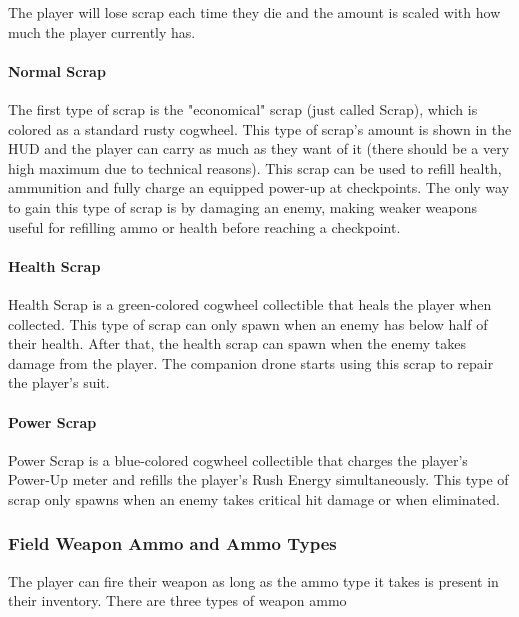 \documentclass[12pt]{article}
\begin{document}
The player will lose scrap each time they die and the amount is scaled with how much the player currently has. 

\paragraph{Normal Scrap}

The first type of scrap is the "economical" scrap (just called Scrap), which is colored as a standard rusty cogwheel. This type of scrap's amount is shown in the HUD and the player can carry as much as they want of it (there should be a very high maximum due to technical reasons). This scrap can be used to refill health, ammunition and fully charge an equipped power-up at checkpoints. %
The only way to gain this type of scrap is by damaging an enemy, making weaker weapons useful for refilling ammo or health before reaching a checkpoint. 

\paragraph{Health Scrap}

Health Scrap is a green-colored cogwheel collectible that heals the player when collected. This type of scrap can only spawn when an enemy has below half of their health. After that, the health scrap can spawn when the enemy takes damage from the player. The companion drone starts using this scrap to repair the player's suit. 

\paragraph{Power Scrap}

Power Scrap is a blue-colored cogwheel collectible that charges the player's Power-Up meter and refills the player's Rush Energy simultaneously. This type of scrap only spawns when an enemy takes critical hit damage or when eliminated.

\subsubsection{Field Weapon Ammo and Ammo Types}

The player can fire their weapon as long as the ammo type it takes is present in their inventory. There are three types of weapon ammo
\end{document}
